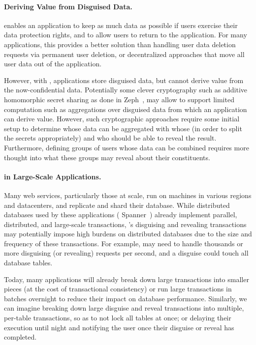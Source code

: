 %
\paragraph{Deriving Value from Disguised Data.} 
\sys enables an application to keep as much data as possible if users exercise
their data protection rights, and to allow users to return to the application.
For many applications, this provides a better solution than handling user data
deletion requests via permanent user deletion, or decentralized approaches that
move all user data out of the application.

However, with \sys, applications store disguised data, but cannot derive value
from the now-confidential data.
%
Potentially some clever cryptography such as additive homomorphic secret sharing
as done in Zeph~\cite{zeph}, may allow \sys to support limited computation such
as aggregations over disguised data from which an application can derive value.
%
However, such cryptographic approaches require some initial setup to determine
whose data can be aggregated with whose (in order to split the secrets
appropriately) and who should be able to reveal the result. Furthermore, defining
groups of users whose data can be combined requires more thought into what these
groups may reveal about their constituents.
%

\paragraph{\sys in Large-Scale Applications.}
Many web services, particularly those at scale, run on machines in various
regions and datacenters, and replicate and shard their database.
%
While distributed databases used by these applications (\eg
Spanner~\cite{spanner}) already implement parallel, distributed, and large-scale
transactions, \sys's disguising and revealing transactions may potentially
impose high burdens on distributed databases due to the size and frequency of
these transactions.
%
For example, \sys may need to handle thousands or more disguising (or
revealing) requests per second, and a disguise could touch all database tables.
%

%
Today, many applications will already break down large transactions into smaller
pieces (at the cost of transactional consistency) or run large transactions in
batches overnight to reduce their impact on database performance.
%
Similarly, we can imagine \sys breaking down large disguise and reveal transactions
into multiple, per-table transactions, so as to not lock all tables at once; or
delaying their execution until night and notifying the user once their
disguise or reveal has completed. 
%

